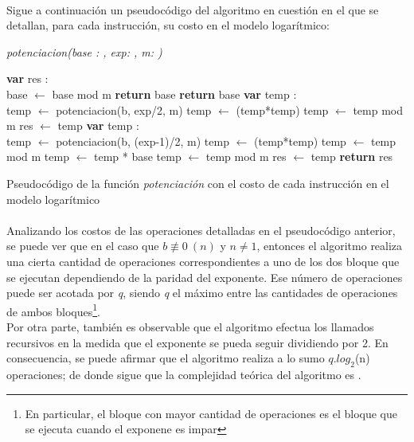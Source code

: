 \paragraph{}
Sigue a continuación un pseudocódigo del algoritmo en cuestión en el que se detallan, para cada instrucción, su costo en el modelo logarítmico: \\

\newpage
	\incmargin{1em}
	\linesnumbered

	\textsl{potenciacion(base : \nat,  exp: \nat,  m: \nat)}\\
		\begin{algorithm}[H]
			\BlankLine
			\textbf{var} res : \entero \\
			\BlankLine
			base $\leftarrow$ base mod m 
			\BlankLine
			 	{\textbf{return} base}
			{
				{\textbf{return} base}
			{
				{\textbf{var} temp : \entero \\
				temp $\leftarrow$ potenciacion(b, exp/2, m) 
				temp $\leftarrow$ (temp*temp) 
				temp $\leftarrow$ temp mod m 
				res $\leftarrow$ temp }
				{\textbf{var} temp : \entero \\
				temp $\leftarrow$ potenciacion(b, (exp-1)/2, m) 
				temp $\leftarrow$ (temp*temp) 
				temp $\leftarrow$ temp mod m 
				temp $\leftarrow$ temp * base 
				temp $\leftarrow$ temp mod m 
				res $\leftarrow$ temp }
			}}
			\BlankLine
			\textbf{return} res
			\caption{Pseudocódigo de la función \textit{potenciación} con el costo de cada instrucción en el modelo logarítmico}
		\end{algorithm}

\paragraph{}
Analizando los costos de las operaciones detalladas en el pseudocódigo anterior, se puede ver que en el caso que $b \not \equiv 0\ (n)$  y $n \neq 1$, entonces el algoritmo realiza una cierta cantidad de operaciones correspondientes a uno de los dos bloque que se ejecutan dependiendo de la paridad del exponente. Ese número de operaciones puede ser acotada por \textit{q}, siendo \textit{q} el máximo entre las cantidades de operaciones de ambos bloques\footnote{En particular, el bloque con mayor cantidad de operaciones es el bloque que se ejecuta cuando el exponene es impar}. \\
Por otra parte, también es observable que el algoritmo efectua los llamados recursivos en la medida que el exponente se pueda seguir dividiendo por 2. En consecuencia, se puede afirmar que el algoritmo realiza a lo sumo $q.log_2$(n) operaciones; de donde sigue que la complejidad teórica del algoritmo es .



